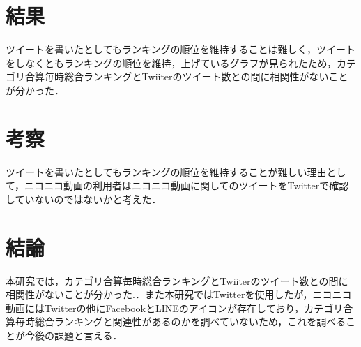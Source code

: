 \documentclass[uplatex,twocolumn,dvipdfmx]{jsarticle}
\begin{document}
\section{結果}
ツイートを書いたとしてもランキングの順位を維持することは難しく，ツイートをしなくともランキングの順位を維持，上げているグラフが見られたため，カテゴリ合算毎時総合ランキングとTwiiterのツイート数との間に相関性がないことが分かった．
\section{考察}
ツイートを書いたとしてもランキングの順位を維持することが難しい理由として，ニコニコ動画の利用者はニコニコ動画に関してのツイートをTwitterで確認していないのではないかと考えた．
\section{結論}
本研究では，カテゴリ合算毎時総合ランキングとTwiiterのツイート数との間に相関性がないことが分かった.．また本研究ではTwitterを使用したが，ニコニコ動画にはTwitterの他にFacebookとLINEのアイコンが存在しており，カテゴリ合算毎時総合ランキングと関連性があるのかを調べていないため，これを調べることが今後の課題と言える．



\end{document}
